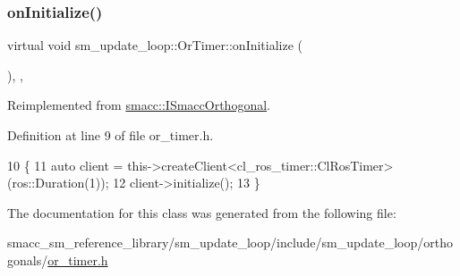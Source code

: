 \subsubsection{\texorpdfstring{on\+Initialize()}{onInitialize()}}
{\footnotesize\ttfamily virtual void sm\+\_\+update\+\_\+loop\+::\+Or\+Timer\+::on\+Initialize (\begin{DoxyParamCaption}{ }\end{DoxyParamCaption})\hspace{0.3cm}{\ttfamily [inline]}, {\ttfamily [override]}, {\ttfamily [virtual]}}



Reimplemented from \hyperlink{classsmacc_1_1ISmaccOrthogonal_a6bb31c620cb64dd7b8417f8705c79c7a}{smacc\+::\+I\+Smacc\+Orthogonal}.



Definition at line 9 of file or\+\_\+timer.\+h.


\begin{DoxyCode}
10     \{
11         \textcolor{keyword}{auto} client = this->createClient<cl\_ros\_timer::ClRosTimer>(ros::Duration(1));
12         client->initialize();
13     \}
\end{DoxyCode}


The documentation for this class was generated from the following file\+:\begin{DoxyCompactItemize}
\item 
smacc\+\_\+sm\+\_\+reference\+\_\+library/sm\+\_\+update\+\_\+loop/include/sm\+\_\+update\+\_\+loop/orthogonals/\hyperlink{smacc__sm__reference__library_2sm__update__loop_2include_2sm__update__loop_2orthogonals_2or__timer_8h}{or\+\_\+timer.\+h}\end{DoxyCompactItemize}
